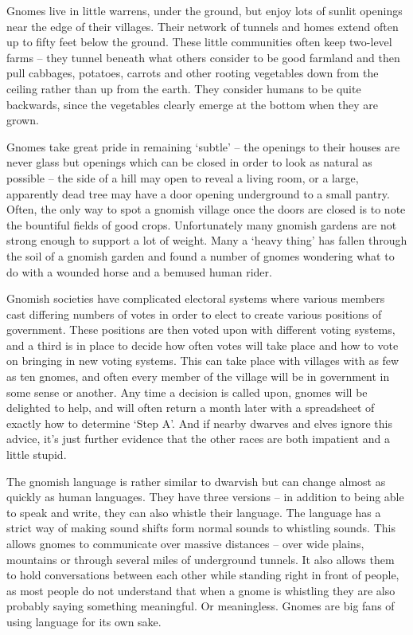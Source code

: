 \documentclass[titlepage,a4paper,openany]{book}
\begin{document}
\begin{multicols}{2}

Gnomes live in little warrens, under the ground, but enjoy lots of sunlit openings near the edge of their villages. Their network of tunnels and homes extend often up to fifty feet below the ground. These little communities often keep two-level farms -- they tunnel beneath what others consider to be good farmland and then pull cabbages, potatoes, carrots and other rooting vegetables down from the ceiling rather than up from the earth. They consider humans to be quite backwards, since the vegetables clearly emerge at the bottom when they are grown.

Gnomes take great pride in remaining `subtle' -- the openings to their houses are never glass but openings which can be closed in order to look as natural as possible -- the side of a hill may open to reveal a living room, or a large, apparently dead tree may have a door opening underground to a small pantry. Often, the only way to spot a gnomish village once the doors are closed is to note the bountiful fields of good crops. Unfortunately many gnomish gardens are not strong enough to support a lot of weight. Many a `heavy thing' has fallen through the soil of a gnomish garden and found a number of gnomes wondering what to do with a wounded horse and a bemused human rider.

Gnomish societies have complicated electoral systems where various members cast differing numbers of votes in order to elect to create various positions of government. These positions are then voted upon with different voting systems, and a third is in place to decide how often votes will take place and how to vote on bringing in new voting systems. This can take place with villages with as few as ten gnomes, and often every member of the village will be in government in some sense or another. Any time a decision is called upon, gnomes will be delighted to help, and will often return a month later with a spreadsheet of exactly how to determine `Step A'. And if nearby dwarves and elves ignore this advice, it's just further evidence that the other races are both impatient and a little stupid.

The gnomish language is rather similar to dwarvish but can change almost as quickly as human languages. They have three versions -- in addition to being able to speak and write, they can also whistle their language. The language has a strict way of making sound shifts form normal sounds to whistling sounds. This allows gnomes to communicate over massive distances -- over wide plains, mountains or through several miles of underground tunnels. It also allows them to hold conversations between each other while standing right in front of people, as most people do not understand that when a gnome is whistling they are also probably saying something meaningful. Or meaningless. Gnomes are big fans of using language for its own sake. 


\end{multicols}
\end{document}
